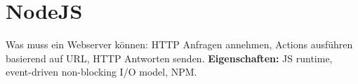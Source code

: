 
\section{NodeJS}
Was muss ein Webserver können: HTTP Anfragen annehmen, Actions ausführen basierend auf URL, HTTP Antworten senden. \textbf{Eigenschaften:} JS runtime, event-driven non-blocking I/O model, NPM.